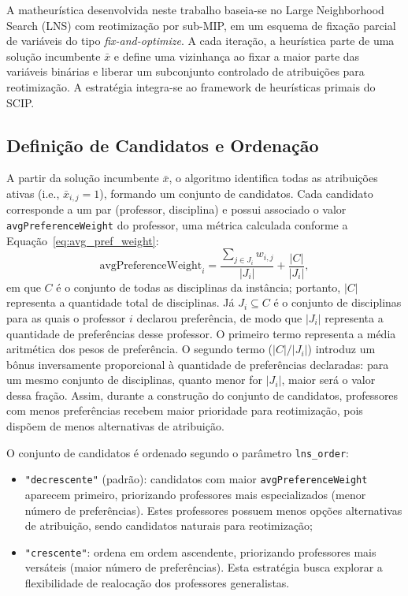 A matheurística desenvolvida neste trabalho baseia-se no Large Neighborhood Search (LNS) com reotimização por sub-MIP, em um esquema de fixação parcial de variáveis do tipo \textit{fix-and-optimize}. A cada iteração, a heurística parte de uma solução incumbente $\bar{x}$ e define uma vizinhança ao fixar a maior parte das variáveis binárias e liberar um subconjunto controlado de atribuições para reotimização. A estratégia integra-se ao framework de heurísticas primais do SCIP.

\subsection{Definição de Candidatos e Ordenação}

A partir da solução incumbente $\bar{x}$, o algoritmo identifica todas as atribuições ativas (i.e., $\bar{x}_{i,j}=1$), formando um conjunto de candidatos. Cada candidato corresponde a um par (professor, disciplina) e possui associado o valor \texttt{avgPreferenceWeight} do professor, uma métrica calculada conforme a Equação~\eqref{eq:avg_pref_weight}:
\begin{equation} \label{eq:avg_pref_weight}
\text{avgPreferenceWeight}_i = \frac{\sum_{j \in J_i} w_{i,j}}{|J_i|} + \frac{|C|}{|J_i|},
\end{equation}
em que $C$ é o conjunto de todas as disciplinas da instância; portanto, $|C|$ representa a quantidade total de disciplinas. Já $J_i \subseteq C$ é o conjunto de disciplinas para as quais o professor $i$ declarou preferência, de modo que $|J_i|$ representa a quantidade de preferências desse professor. O primeiro termo representa a média aritmética dos pesos de preferência. O segundo termo ($|C|/|J_i|$) introduz um bônus inversamente proporcional à quantidade de preferências declaradas: para um mesmo conjunto de disciplinas, quanto menor for $|J_i|$, maior será o valor dessa fração. Assim, durante a construção do conjunto de candidatos, professores com menos preferências recebem maior prioridade para reotimização, pois dispõem de menos alternativas de atribuição.

O conjunto de candidatos é ordenado segundo o parâmetro \texttt{lns\_order}:
\begin{itemize}
  \item \texttt{"decrescente"} (padrão): candidatos com maior \texttt{avgPreferenceWeight} aparecem primeiro, priorizando professores mais especializados (menor número de preferências). Estes professores possuem menos opções alternativas de atribuição, sendo candidatos naturais para reotimização;
  \item \texttt{"crescente"}: ordena em ordem ascendente, priorizando professores mais versáteis (maior número de preferências). Esta estratégia busca explorar a flexibilidade de realocação dos professores generalistas.
\end{itemize}

